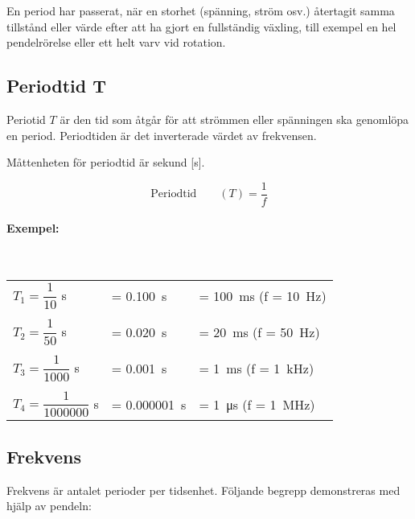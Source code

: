 En period har passerat, när en storhet (spänning, ström osv.) återtagit samma
tillstånd eller värde efter att ha gjort en fullständig växling, till exempel en hel
pendelrörelse eller ett helt varv vid rotation.

\newpage
\subsection{Periodtid T}

Periotid \(T\) är den tid som åtgår för att strömmen eller spänningen ska
genomlöpa en period. Periodtiden är det inverterade värdet av frekvensen.

Måttenheten för periodtid är sekund [s].

$$\text{Periodtid} \qquad (T) = \dfrac{1}{f}$$

\noindent

\paragraph{Exempel:}~\\[1ex]
\begin{small}
\begin{tabular}{@{}lll}
\(T_1=\dfrac{1}{10}\) s & = \SI{0,100}{\second} & = \SI{100}{\milli\second} (f = \SI{10}{\hertz})\\
\\
\(T_2=\dfrac{1}{50}\) s & = \SI{0,020}{\second} & = \SI{20}{\milli\second} (f = \SI{50}{\hertz})\\
\\
\(T_3=\dfrac{1}{1000}\) s & = \SI{0,001}{\second} & = \SI{1}{\milli\second} (f = \SI{1}{\kilo\hertz})\\
\\
\(T_4=\dfrac{1}{1000000}\) s & = \SI{0,000001}{\second} & = \SI{1}{\micro\second} (f = \SI{1}{\mega\hertz})\\
\end{tabular}
\end{small}

\subsection{Frekvens}
\label{frekvens}

Frekvens är antalet perioder per tidsenhet.
Följande begrepp demonstreras med hjälp av pendeln:

